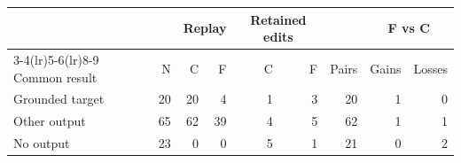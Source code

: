 \begin{tabular}{lrrrrrrrr}
\toprule
 & & \multicolumn{2}{c}{Replay} & \multicolumn{2}{c}{Retained edits} & & \multicolumn{2}{c}{F vs C} \\
\cmidrule(lr){3-4}\cmidrule(lr){5-6}\cmidrule(lr){8-9}
Common result & N & C & F & C & F & Pairs & Gains & Losses \\
\midrule
Grounded target & 20 & 20 & 4 & 1 & 3 & 20 & 1 & 0 \\
Other output & 65 & 62 & 39 & 4 & 5 & 62 & 1 & 1 \\
No output & 23 & 0 & 0 & 5 & 1 & 21 & 0 & 2 \\
\bottomrule
\end{tabular}
